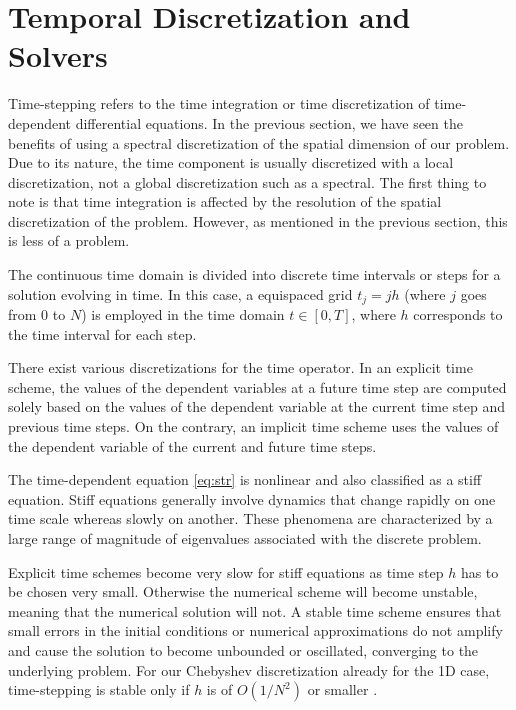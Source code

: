 
\section{Temporal Discretization and Solvers} \label{sec:time}

Time-stepping refers to the time integration or time discretization of
time-dependent differential equations. In the previous section, we have seen
the benefits of using a spectral discretization of the spatial dimension of our
problem. Due to its nature, the time component is usually discretized with a
local discretization, not a global discretization such as a spectral. The first
thing to note is that time integration is affected by the resolution of the
spatial discretization of the problem. However, as mentioned in the previous
section, this is less of a problem. 

The continuous time domain is divided into discrete time intervals or steps for
a solution evolving in time. In this case, a equispaced grid $t_j = jh$ (where
$j$ goes from $0$ to $N$) is employed in the time domain $t \in [0, T]$, where
$h$ corresponds to the time interval for each step.

There exist various discretizations for the time operator. In an explicit time
scheme, the values of the dependent variables at a future time step are
computed solely based on the values of the dependent variable at the current
time step and previous time steps. On the contrary, an implicit time scheme
uses the values of the dependent variable of the current and future time steps.

The time-dependent equation \eqref{eq:str} is nonlinear and also classified as
a stiff equation. Stiff equations generally involve dynamics that change
rapidly on one time scale whereas slowly on another. These phenomena are
characterized by a large range of magnitude of eigenvalues associated with the
discrete problem.

Explicit time schemes become very slow for stiff equations as time step $h$ has
to be chosen very small. Otherwise the numerical scheme will become unstable,
meaning that the numerical solution will not. A stable time scheme ensures that
small errors in the initial conditions or numerical approximations do not
amplify and cause the solution to become unbounded or oscillated, converging to
the underlying problem. For our Chebyshev discretization already for the 1D
case, time-stepping is stable only if $h$ is of $O(1/N^2)$ or smaller
\citep{boyd2001}.

